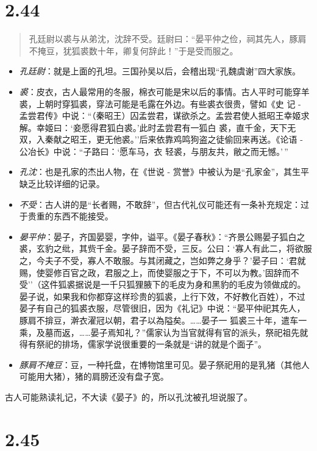\documentclass[]{book}
\providecommand{\tightlist}{%
  \setlength{\itemsep}{0pt}\setlength{\parskip}{0pt}}
\begin{document}
\section{2.44}\label{section-90}

\begin{quote}
孔廷尉以裘与从弟沈，沈辞不受。廷尉曰：``晏平仲之俭，祠其先人，豚肩不掩豆，犹狐裘数十年，卿复何辞此！''于是受而服之。
\end{quote}

\begin{itemize}
\tightlist
\item
  \emph{孔廷尉}：就是上面的孔坦。三国孙吴以后，会稽出现``孔魏虞谢''四大家族。
\item
  \emph{裘}：皮衣，古人最常用的冬服，棉衣可能是宋以后的事情。古人平时可能穿羊裘，上朝时穿狐裘，穿法可能是毛露在外边。有些裘衣很贵，譬如《史
  记 -
  孟尝君传》中说：``（秦昭王）囚孟尝君，谋欲杀之。孟尝君使人抵昭王幸姬求解。幸姬曰：`妾愿得君狐白裘。'此时孟尝君有一狐白
  裘，直千金，天下无双，入秦献之昭王，更无他裘。''后来依靠鸡鸣狗盗之徒偷回来再送。《论语
  - 公冶长》中说：``子路曰：`愿车马，衣
  轻裘，与朋友共，敝之而无憾。'\,''
\item
  \emph{孔沈}：也是孔家的杰出人物，在《世说 -
  赏誉》中被认为是``孔家金''，其生平缺乏比较详细的记录。
\item
  \emph{不受}：古人讲的是``长者赐，不敢辞''，但古代礼仪可能还有一条补充规定：过于贵重的东西不能接受。
\item
  \emph{晏平仲}：晏子，齐国晏婴，字仲，谥平。《晏子春秋》：``齐景公赐晏子狐白之裘，玄豹之纰，其赀千金。晏子辞而不受，三反。公曰：`寡人有此二，将欲服之，今夫子不受，寡人不敢服。与其闭藏之，岂如弊之身乎？'晏子曰：`君就赐，使婴修百官之政，君服之上，而使婴服之于下，不可以为教。'固辞而不受''（这件狐裘据说是一千只狐狸腋下的毛皮为身和黑豹的毛皮为领做成的。晏子说，如果我和你都穿这样珍贵的狐裘，上行下效，不好教化百姓），不过晏子有自己的狐裘衣服，尽管很旧，因为《礼记》中说：``晏平仲祀其先人，豚肩不揜豆，澣衣濯冠以朝，君子以為隘矣。\ldots{}\ldots{}晏子一
  狐裘三十年，遣车一乘，及墓而返，\ldots{}\ldots{}晏子焉知礼？''儒家认为当官就得有官的派头，祭祀祖先就得有祭祀的排场，儒家学说很重要的一条就是``讲的就是个面子''。
\item
  \emph{豚肩不掩豆}：豆，一种托盘，在博物馆里可见。晏子祭祀用的是乳猪（其他人可能用大猪），猪的肩膀还没有盘子宽。
\end{itemize}

古人可能熟读礼记，不大读《晏子》的，所以孔沈被孔坦说服了。

\section{2.45}\label{section-91}
\end{document}
